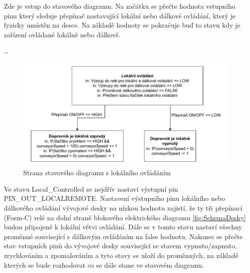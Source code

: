 Zde je vstup do stavového diagramu. Na začátku se přečte hodnota vstupního pinu který sleduje přepínač nastavující lokální nebo dálkové ovládání, který je fyzicky umístěn na desce. Na základě hodnoty se pokračuje buď to stavu kdy je zařízení ovládané lokálně nebo dálkově.

\dots
\begin{figure}[H]
    \centering
    \includegraphics[width=1\linewidth]{images/StateFlow_Firmwaru_left.drawio.pdf}
    \caption{Strana stavového diagramu s lokálního ovládáním}
    \label{fig:StateFlow_Firmwaru_left}
\end{figure}

Ve stavu Local\_Controlled se nejdřív nastaví výstupní pin PIN\_OUT\_LOCALREMOTE. Nastavení výstupního pinu lokálního nebo dálkového ovládání vývojové desky na nízkou hodnotu zajistí, že ty tři přepínací (Form-C) relé na dolní straně blokového elektrického diagramu \ref{fig:SchemaDesky} budou připojené k lokální větvi ovládání. Dále se v tomto stavu nastaví všechny proměnné související s dálkovým ovládáním na false hodnotu. Nakonec se přečte stav vstupních pinů do vývojové desky související se stavem vypnuto/zapnuto, zrychlováním a zpomalováním a tyto stavy se uloží do proměnných, na základě kterých se bude rozhodovat co se dále stane ve stavovém diagramu.



